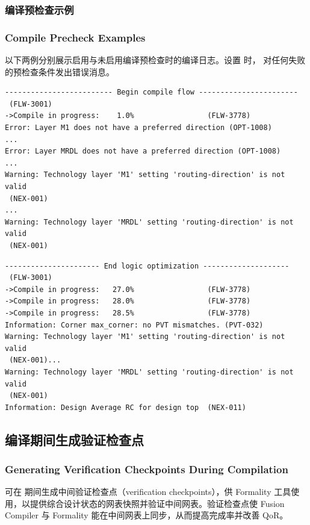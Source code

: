 \subsubsection{编译预检查示例}
\subsubsection*{Compile Precheck Examples}

以下两例分别展示启用与未启用编译预检查时的编译日志。设置  时， 对任何失败的预检查条件发出错误消息。

\begin{lstlisting}[caption={启用编译预检查的编译日志（原书 Example 14）}]
------------------------- Begin compile flow -----------------------
 (FLW-3001)
->Compile in progress:    1.0%                 (FLW-3778)
Error: Layer M1 does not have a preferred direction (OPT-1008)
...
Error: Layer MRDL does not have a preferred direction (OPT-1008)
...
Warning: Technology layer 'M1' setting 'routing-direction' is not valid
 (NEX-001)
...
Warning: Technology layer 'MRDL' setting 'routing-direction' is not valid
 (NEX-001)
\end{lstlisting}

\begin{lstlisting}[caption={未启用编译预检查的编译日志（原书 Example 15）}]
---------------------- End logic optimization --------------------
 (FLW-3001)
->Compile in progress:   27.0%                 (FLW-3778)
->Compile in progress:   28.0%                 (FLW-3778)
->Compile in progress:   28.5%                 (FLW-3778)
Information: Corner max_corner: no PVT mismatches. (PVT-032)
Warning: Technology layer 'M1' setting 'routing-direction' is not valid
 (NEX-001)...
Warning: Technology layer 'MRDL' setting 'routing-direction' is not valid
 (NEX-001)
Information: Design Average RC for design top  (NEX-011)
\end{lstlisting}

\subsection{编译期间生成验证检查点}
\subsubsection*{Generating Verification Checkpoints During Compilation}

可在  期间生成中间验证检查点（verification checkpoints），供 Formality 工具使用，以提供综合设计状态的网表快照并验证中间网表。验证检查点使 Fusion Compiler 与 Formality 能在中间网表上同步，从而提高完成率并改善 QoR。

